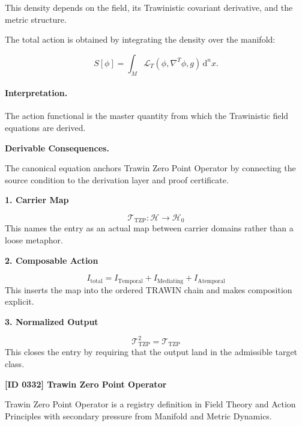 This density depends on the field, its Trawinistic covariant derivative, and the metric structure.

The total action is obtained by integrating the density over the manifold:

\begin{equation}
\boxed{
S[\phi]
=
\int_M
\mathcal{L}_T
\left(
\phi,\nabla^T\phi,g
\right)
\,\mathrm{d}^n x .
}
\end{equation}

\paragraph{Interpretation.}
The action functional is the master quantity from which the Trawinistic field equations are derived.

\par\vspace{0.35em}
\noindent\textbf{Derivable Consequences.}\quad
\begingroup
\footnotesize
\raggedright
The canonical equation anchors Trawin Zero Point Operator by connecting the source condition to the derivation layer and proof certificate.
\par\endgroup

\noindent\textbf{1. Carrier Map}\par
\[
\mathcal{T}_{\mathrm{TZP}}:\mathcal{H}\to\mathcal{H}_{0}
\]
\noindent This names the entry as an actual map between carrier domains rather than a loose metaphor.\par
\noindent\textbf{2. Composable Action}\par
\[
I_{\mathrm{total}}=I_{\mathrm{Temporal}}+I_{\mathrm{Mediating}}+I_{\mathrm{Atemporal}}
\]
\noindent This inserts the map into the ordered TRAWIN chain and makes composition explicit.\par
\noindent\textbf{3. Normalized Output}\par
\[
\mathcal{T}_{\mathrm{TZP}}^{2}=\mathcal{T}_{\mathrm{TZP}}
\]
\noindent This closes the entry by requiring that the output land in the admissible target class.\par

\clearpage
\noindent\textbf{[ID 0332] Trawin Zero Point Operator}\par
\vspace{0.35em}
\begingroup\small
{}
Trawin Zero Point Operator is a registry definition in Field Theory and Action Principles with secondary pressure from Manifold and Metric Dynamics.

